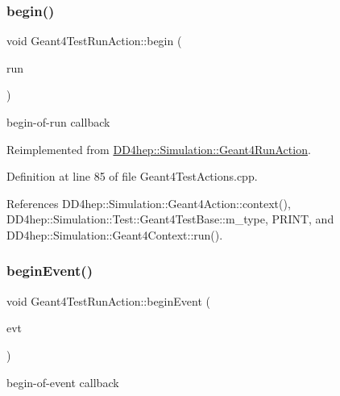 \subsubsection{\texorpdfstring{begin()}{begin()}}
{\footnotesize\ttfamily void Geant4\+Test\+Run\+Action\+::begin (\begin{DoxyParamCaption}\item[{const G4\+Run $\ast$}]{run }\end{DoxyParamCaption})\hspace{0.3cm}{\ttfamily [virtual]}}



begin-\/of-\/run callback 



Reimplemented from \hyperlink{class_d_d4hep_1_1_simulation_1_1_geant4_run_action_aeea4684e5d27e039b26734c3dbf3f65b}{D\+D4hep\+::\+Simulation\+::\+Geant4\+Run\+Action}.



Definition at line 85 of file Geant4\+Test\+Actions.\+cpp.



References D\+D4hep\+::\+Simulation\+::\+Geant4\+Action\+::context(), D\+D4hep\+::\+Simulation\+::\+Test\+::\+Geant4\+Test\+Base\+::m\+\_\+type, P\+R\+I\+NT, and D\+D4hep\+::\+Simulation\+::\+Geant4\+Context\+::run().

\hypertarget{class_d_d4hep_1_1_simulation_1_1_test_1_1_geant4_test_run_action_af1b4e87826ebabd5a73c9fc4a1f853d5}{}\label{class_d_d4hep_1_1_simulation_1_1_test_1_1_geant4_test_run_action_af1b4e87826ebabd5a73c9fc4a1f853d5} 
\subsubsection{\texorpdfstring{begin\+Event()}{beginEvent()}}
{\footnotesize\ttfamily void Geant4\+Test\+Run\+Action\+::begin\+Event (\begin{DoxyParamCaption}\item[{const G4\+Event $\ast$}]{evt }\end{DoxyParamCaption})}



begin-\/of-\/event callback 



